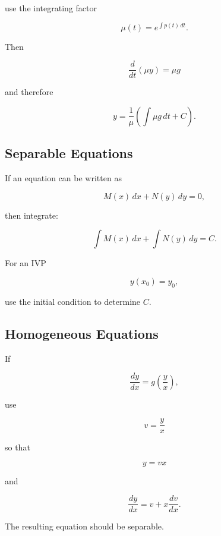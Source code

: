 \documentclass[11pt]{article}
\begin{document}
use the integrating factor

\[
\boxed{
\mu(t)=e^{\int p(t)\,dt}
}.
\]

Then

\[
\boxed{
\frac{d}{dt}(\mu y)=\mu g
}
\]

and therefore

\[
\boxed{
y
=
\frac{1}{\mu}
\left(
\int\mu g\,dt+C
\right)
}.
\]

\subsection{Separable Equations}

If an equation can be written as

\[
M(x)\,dx+N(y)\,dy=0,
\]

then integrate:

\[
\boxed{
\int M(x)\,dx+\int N(y)\,dy=C
}.
\]

For an IVP

\[
y(x_0)=y_0,
\]

use the initial condition to determine $C$.

\subsection{Homogeneous Equations}

If

\[
\frac{dy}{dx}
=
g\left(\frac{y}{x}\right),
\]

use

\[
\boxed{
v=\frac{y}{x}
}
\]

so that

\[
\boxed{
y=vx
}
\]

and

\[
\boxed{
\frac{dy}{dx}
=
v+x\frac{dv}{dx}
}.
\]

The resulting equation should be separable.

\end{document}
